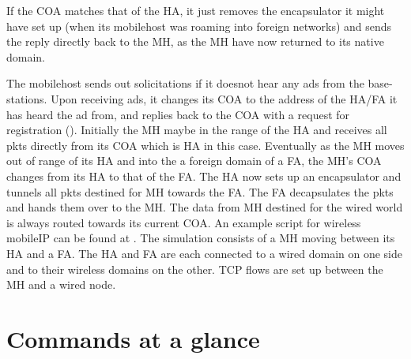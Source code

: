 {If the COA matches that of the HA, it just removes the encapsulator it might have set up (when its mobilehost was roaming into foreign networks) and sends the reply directly back to the MH, as the MH have now returned to its native domain.

The mobilehost sends out solicitations if it doesnot hear any ads from the
base-stations. Upon receiving ads, it changes its COA to the address of
the HA/FA it has heard the ad from, and replies back to the COA with a
request for registration ().
Initially the MH maybe in the range of the HA and receives all pkts
directly from its COA which is HA in this case. 
Eventually as the MH moves out of range of its HA and into the a foreign
domain of a FA, the MH's COA changes from its HA to that of the FA. The HA
now sets up an encapsulator and tunnels all pkts destined for MH towards
the FA. The FA decapsulates the pkts and hands them over to the MH. The
data from MH destined for the wired world is always routed towards its
current COA.  
An example script for wireless mobileIP can be found at
. The simulation consists of a MH moving
between its HA and a FA. The HA and FA are each connected to a wired
domain on one side and to their wireless domains on the other. TCP flows
are set up between the MH and a wired node. 


\section{Commands at a glance}
\label{sec:wirelesscommand}

}
